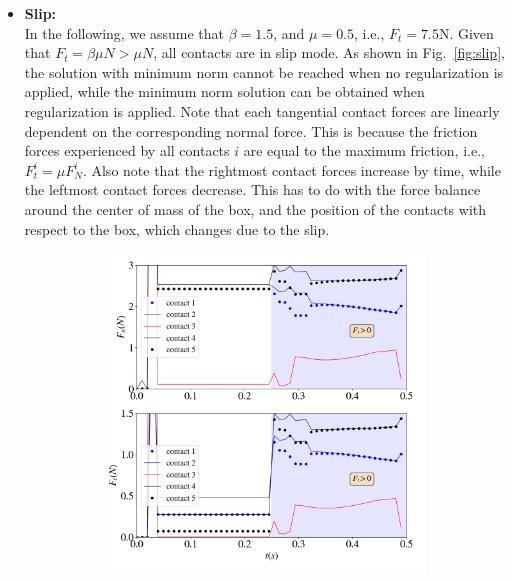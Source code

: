 \begin{itemize}
	\item 	\textbf{Slip:}\\
	In the following, we assume that $\beta=1.5$, and $\mu=0.5$, i.e., $F_t=7.5$\si{N}. Given that $F_t=\beta\mu N> \mu N$, all contacts are in slip mode. As shown in Fig.~\ref{fig:slip}, the solution with minimum norm cannot be reached when no regularization is applied, while the minimum norm solution can be obtained when regularization is applied. Note that each tangential contact forces are linearly dependent on the corresponding normal force. This is because the friction forces experienced by all contacts $i$ are equal to the maximum friction, i.e.,  $F^i_t=\mu F^i_N$. Also note that the rightmost contact forces increase by time, while the leftmost contact forces decrease. This has to do with the force balance around the center of mass of the box, and the position of the contacts with respect to the box, which changes due to the slip. 
	\begin{figure}[H]
		\centering	
		\begin{subfigure}{0.48\columnwidth}	
			\centering
			\includegraphics[width=1.0\textwidth]{images/CD/slip.png}
		\end{subfigure}	
		\begin{subfigure}{0.48\columnwidth}	
			\centering

\end{subfigure}
\end{figure}
\end{itemize}
